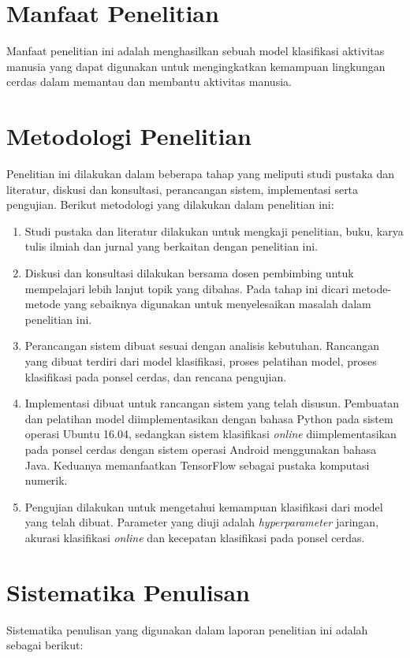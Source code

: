 \section{Manfaat Penelitian}
Manfaat penelitian ini adalah menghasilkan sebuah model klasifikasi aktivitas manusia yang dapat digunakan untuk mengingkatkan kemampuan lingkungan cerdas dalam memantau dan membantu aktivitas manusia.

\section{Metodologi Penelitian}
Penelitian ini dilakukan dalam beberapa tahap yang meliputi studi pustaka dan literatur, diskusi dan konsultasi, perancangan sistem, implementasi serta pengujian. Berikut metodologi yang dilakukan dalam penelitian ini:

\begin{enumerate}
    \item Studi pustaka dan literatur dilakukan untuk mengkaji penelitian, buku, karya tulis ilmiah dan jurnal yang berkaitan dengan penelitian ini.
    \item Diskusi dan konsultasi dilakukan bersama dosen pembimbing untuk mempelajari lebih lanjut topik yang dibahas. Pada tahap ini dicari metode-metode yang sebaiknya digunakan untuk menyelesaikan masalah dalam penelitian ini.
    \item Perancangan sistem dibuat sesuai dengan analisis kebutuhan. Rancangan yang dibuat terdiri dari model klasifikasi, proses pelatihan model, proses klasifikasi pada ponsel cerdas, dan rencana pengujian.
    \item Implementasi dibuat untuk rancangan sistem yang telah disusun. Pembuatan dan pelatihan model diimplementasikan dengan bahasa Python pada sistem operasi Ubuntu 16.04, sedangkan sistem klasifikasi \textit{online} diimplementasikan pada ponsel cerdas dengan sistem operasi Android menggunakan bahasa Java. Keduanya memanfaatkan TensorFlow sebagai pustaka komputasi numerik.
    \item Pengujian dilakukan untuk mengetahui kemampuan klasifikasi dari model yang telah dibuat. Parameter yang diuji adalah \textit{hyperparameter} jaringan, akurasi klasifikasi \textit{online} dan kecepatan klasifikasi pada ponsel cerdas.
\end{enumerate}

\section{Sistematika Penulisan}
Sistematika penulisan yang digunakan dalam laporan penelitian ini adalah sebagai berikut:

